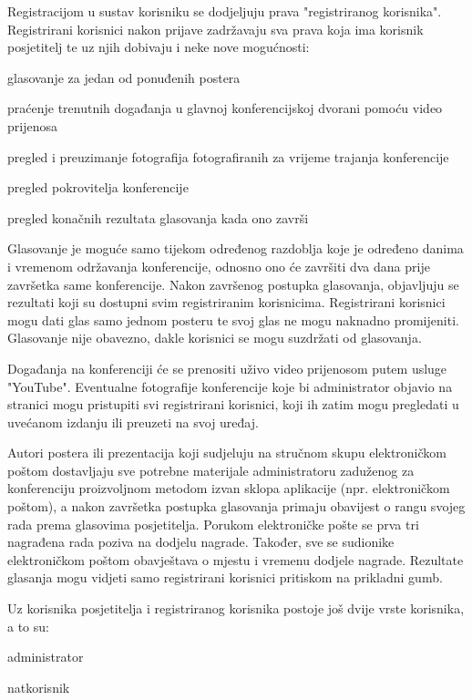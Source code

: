 		Registracijom u sustav korisniku se dodjeljuju prava "registriranog korisnika". 
		Registrirani korisnici nakon prijave zadržavaju sva prava koja ima korisnik posjetitelj te uz njih dobivaju i neke nove mogućnosti:
		\begin{packed_item}
			\item glasovanje za jedan od ponuđenih postera
			\item praćenje trenutnih događanja u glavnoj konferencijskoj dvorani pomoću video prijenosa
			\item pregled i preuzimanje fotografija fotografiranih za vrijeme trajanja konferencije
			\item pregled pokrovitelja konferencije
			\item pregled konačnih rezultata glasovanja kada ono završi
		\end{packed_item}
		
		Glasovanje je moguće samo tijekom određenog razdoblja koje je određeno danima i vremenom održavanja konferencije, odnosno ono će završiti dva dana prije završetka same konferencije. Nakon završenog postupka glasovanja, objavljuju se rezultati koji su dostupni svim registriranim korisnicima. Registrirani korisnici mogu dati glas samo jednom posteru te svoj glas ne mogu naknadno promijeniti. Glasovanje nije obavezno, dakle korisnici se mogu suzdržati od glasovanja.  
		
		Događanja na konferenciji će se prenositi uživo video prijenosom putem usluge "YouTube". Eventualne fotografije konferencije koje bi administrator objavio na stranici mogu pristupiti svi registrirani korisnici, koji ih zatim mogu pregledati u uvećanom izdanju ili preuzeti na svoj uređaj.
		
		Autori postera ili prezentacija koji sudjeluju na stručnom skupu elektroničkom poštom dostavljaju sve potrebne materijale administratoru zaduženog za konferenciju proizvoljnom metodom izvan sklopa aplikacije (npr. elektroničkom poštom), a nakon završetka postupka glasovanja primaju obavijest o rangu svojeg rada prema glasovima posjetitelja. Porukom elektroničke pošte se prva tri nagrađena rada poziva na dodjelu nagrade. Također, sve se sudionike elektroničkom poštom obavještava o mjestu i vremenu dodjele nagrade. Rezultate glasanja mogu vidjeti samo registrirani korisnici pritiskom na prikladni gumb.
		 
		Uz korisnika posjetitelja i registriranog korisnika postoje još dvije vrste korisnika, a to su:
		\begin{packed_item}
			\item administrator
			\item natkorisnik
		\end{packed_item}
		
